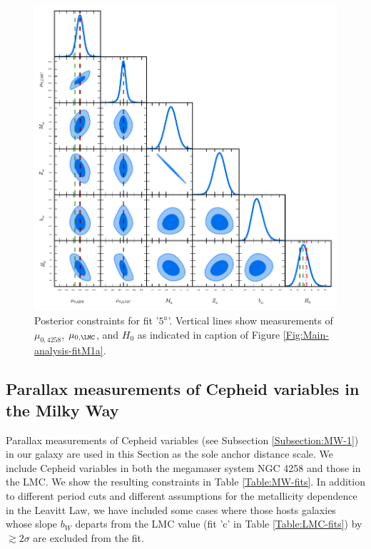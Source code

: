 \begin{figure}[hbtp]
\centering
\includegraphics[scale=1]{figures/chapter-h0/triangle_figure_fit_5a.pdf}
\caption{Posterior constraints for fit '$5^a$'. Vertical lines show measurements of $\mu_{0,4258}$, $\mu_{0,\LMC}$, and $H_0$ as indicated in caption of Figure \ref{Fig:Main-analysis-fitM1a}.  \label{Fig:constraints-fit-5a}}
\end{figure}

\subsection{Parallax measurements of Cepheid variables in the Milky Way}
\label{Subsection:MW}

Parallax measurements of Cepheid variables (see Subsection \ref{Subsection:MW-1}) in our galaxy are used in this Section as the sole anchor distance scale. We include Cepheid variables in both the megamaser system NGC 4258 and those in the LMC. We show the resulting constraints in Table \ref{Table:MW-fits}. In addition to different period cuts and different assumptions for the metallicity dependence in the Leavitt Law, we have included some cases where those hosts galaxies whose slope $b_W$ departs from the LMC value (fit 'c' in Table \ref{Table:LMC-fits}) by $\gtrsim 2\sigma$ are excluded from the fit.

